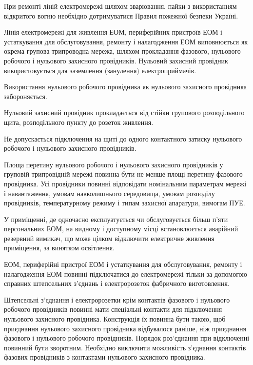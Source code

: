 \documentclass[simple,a4paper,14pt,ukrainian,utf8]{eskdtext}
\begin{document}
\begin{appendices}
                При ремонті ліній електромережі шляхом зварювання, пайки з використанням відкритого вогню необхідно дотримуватися Правил пожежної безпеки Україні.

                Лінія електромережі для живлення ЕОМ, периферійних пристроїв ЕОМ і устаткування для обслуговування, ремонту і налагодження ЕОМ виповнюється як окрема групова трипроводна мережа, шляхом прокладання фазового, нульового робочого і нульового захисного провідників. Нульовий захисний провідник використовується для заземлення (занулення) електроприймачів.

                Використання нульового робочого провідника як нульового захисного провідника забороняється.

                Нульовий захисний провідник прокладається від стійки групового розподільного щита, розподільного пункту до розеток живлення.

                Не допускається підключення на щиті до одного контактного затиску нульового робочого і нульового захисного провідників.

                Площа перетину нульового робочого і нульового захисного провідників у груповій трипровідній мережі повинна бути не менше площі перетину фазового провідника. Усі провідники повинні відповідати номінальним параметрам мережі і навантаження, умовам навколишнього середовища, умовам розподілу провідників, температурному режиму і типам захисної апаратури, вимогам ПУЕ.

                У приміщенні, де одночасно експлуатується чи обслуговується більш п'яти персональних ЕОМ, на видному і доступному місці встановлюється аварійний резервний вимикач, що може цілком відключити електричне живлення приміщення, за винятком освітлення.

                ЕОМ, периферійні пристрої ЕОМ і устаткування для обслуговування, ремонту і налагодження ЕОМ повинні підключатися до електромережі тільки за допомогою справних штепсельних з'єднань і електророзеток фабричного виготовлення.

                Штепсельні з'єднання і електророзетки крім контактів фазового і нульового робочого провідників повинні мати спеціальні контакти для підключення нульового захисного провідника. Конструкція їх повинна бути такою, щоб приєднання нульового захисного провідника відбувалося раніше, ніж приєднання фазового і нульового робочого провідників. Порядок роз'єднання при відключенні повинний бути зворотним. Необхідно виключити можливість з'єднання контактів фазових провідників з контактами нульового захисного провідника.


\end{appendices}
\end{document}
